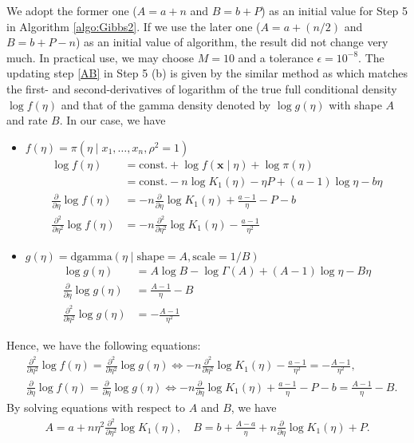 \documentclass[11pt]{article}
\theoremstyle{plain}
\theoremstyle{definition}
\begin{document}
We adopt the former one ($A=a+n$ and $B=b+P$) as an initial value for Step 5 in Algorithm \ref{algo:Gibbs2}. If we use the later one ($A=a+(n/2)$ and $B=b+P-n$) as an initial value of algorithm, the result did not change very much. In practical use, we may choose $M=10$ and a tolerance $\epsilon=10^{-8}$. The updating step \eqref{AB} in Step 5 (b) is given by the similar method as \cite{M19} which matches the first- and second-derivatives of logarithm of the true full conditional density $\log f(\eta)$ and that of the gamma density denoted by $\log g(\eta)$ with shape $A$ and rate $B$. In our case, we have
\begin{itemize}
\item $f(\eta)=\pi(\eta\mid x_{1},\dots,x_{n},\rho^2=1)$
\begin{align*}
\log f(\eta)&=\text{const.}+\log f(\bm{x}\mid\eta)+\log\pi(\eta)\\
&=\text{const.}-n\log K_1(\eta)-\eta P+(a-1)\log \eta-b\eta\\
\frac{\partial}{\partial \eta}\log f(\eta)&=-n\frac{\partial}{\partial \eta}\log K_{1}(\eta)+\frac{a-1}{\eta}-P-b\\
\frac{\partial^2}{\partial \eta^2}\log f(\eta)&=-n\frac{\partial^2}{\partial \eta^2}\log K_{1}(\eta)-\frac{a-1}{\eta^2}
\end{align*}
\item $g(\eta)=\text{dgamma}(\eta\mid\text{shape}=A,\text{scale}=1/B)$
\begin{align*}
\log g(\eta)&=A\log B-\log \Gamma(A)+(A-1)\log \eta-B\eta\\
\frac{\partial}{\partial \eta}\log g(\eta)&=\frac{A-1}{\eta}-B\\
\frac{\partial^2}{\partial \eta^2}\log g(\eta)&=-\frac{A-1}{\eta^2}
\end{align*}
\end{itemize}
Hence, we have the following equations:
\begin{align*}
&\frac{\partial^2}{\partial \eta^2}\log f(\eta)=\frac{\partial^2}{\partial \eta^2}\log g(\eta)\iff -n\frac{\partial^2}{\partial \eta^2}\log K_{1}(\eta)-\frac{a-1}{\eta^2}=-\frac{A-1}{\eta^2},\\
&\frac{\partial}{\partial \eta}\log f(\eta)=\frac{\partial}{\partial \eta}\log g(\eta)\iff -n\frac{\partial}{\partial \eta}\log K_{1}(\eta)+\frac{a-1}{\eta}-P-b=\frac{A-1}{\eta}-B.
\end{align*}
By solving equations with respect to $A$ and $B$, we have
\begin{align*}
A=a+n\eta^2\frac{\partial^2}{\partial \eta^2}\log K_{1}(\eta),\quad B=b+\frac{A-a}{\eta}+n\frac{\partial}{\partial \eta}\log K_{1}(\eta)+P.
\end{align*}
\end{document}
